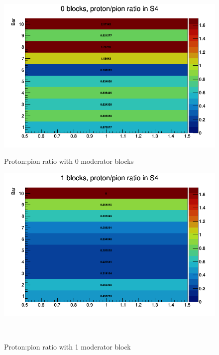    	\begin{figure}[ht]
   		\begin{minipage}[t]{0.48\textwidth}
   			\centering
   			\includegraphics[width=\textwidth]{files/Figures/0blocks_propiratio_vert}
   			\caption{Proton:pion ratio with 0 moderator blocks}
   			\label{fig:0blocks_propiratio_vert}
   		\end{minipage}
   		\hspace{0.3cm}
    	\begin{minipage}[t]{0.48\textwidth}
    		\centering
    		\includegraphics[width=\textwidth]{files/Figures/1blocks_propiratio_vert}
    		\caption{Proton:pion ratio with 1 moderator block}
    		\label{fig:1blocks_propiratio_vert}
    	\end{minipage}	\\
    	\begin{minipage}[t]{0.48\textwidth}

\end{minipage}
\end{figure}
